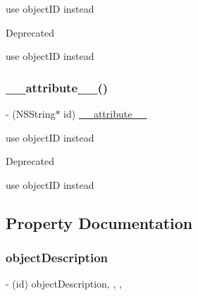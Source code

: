 use object\+ID instead \begin{DoxyRefDesc}{Deprecated}
\item[\hyperlink{deprecated__deprecated000214}{Deprecated}]use object\+ID instead \end{DoxyRefDesc}
\mbox{\label{protocolFBOpenGraphObject-p_a91cba0c24949be9c3158598b20fc276e}} 
\subsubsection{\texorpdfstring{\+\_\+\+\_\+attribute\+\_\+\+\_\+()}{\_\_attribute\_\_()}\hspace{0.1cm}{\footnotesize\ttfamily [5/5]}}
{\footnotesize\ttfamily -\/ (N\+S\+String$\ast$ id) \hyperlink{struct____attribute____}{\+\_\+\+\_\+attribute\+\_\+\+\_\+} \begin{DoxyParamCaption}\item[{((deprecated(\char`\"{}use object\+ID instead\char`\"{})))}]{ }\end{DoxyParamCaption}}

use object\+ID instead \begin{DoxyRefDesc}{Deprecated}
\item[\hyperlink{deprecated__deprecated000209}{Deprecated}]use object\+ID instead \end{DoxyRefDesc}


\subsection{Property Documentation}
\mbox{\label{protocolFBOpenGraphObject-p_a0d00a4eefc8f313c02a0fb01a32c8eb8}} 
\subsubsection{\texorpdfstring{object\+Description}{objectDescription}}
{\footnotesize\ttfamily -\/ (id) object\+Description\hspace{0.3cm}{\ttfamily [read]}, {\ttfamily [write]}, {\ttfamily [nonatomic]}, {\ttfamily [retain]}}

